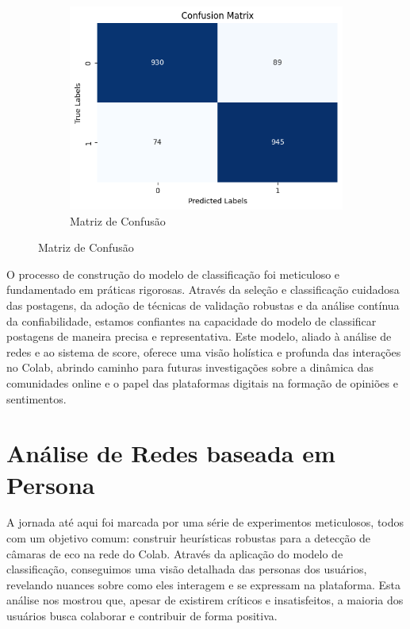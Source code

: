 \begin{figure}[htb]
\begin{subfigure}[b]{0.49\textwidth}
		\includegraphics[width=\textwidth]{images/persona_confusion_matrix.png}
		\caption{Matriz de Confusão}
		\label{fig:persona_confusion_matrix}
	\end{subfigure}
	\fautor
\end{figure}

O processo de construção do modelo de classificação foi meticuloso e fundamentado em práticas rigorosas. Através da seleção e classificação cuidadosa das postagens, da adoção de técnicas de validação robustas e da análise contínua da confiabilidade, estamos confiantes na capacidade do modelo de classificar postagens de maneira precisa e representativa. Este modelo, aliado à análise de redes e ao sistema de score, oferece uma visão holística e profunda das interações no Colab, abrindo caminho para futuras investigações sobre a dinâmica das comunidades online e o papel das plataformas digitais na formação de opiniões e sentimentos.

\section{Análise de Redes baseada em Persona}

A jornada até aqui foi marcada por uma série de experimentos meticulosos, todos com um objetivo comum: construir heurísticas robustas para a detecção de câmaras de eco na rede do Colab. Através da aplicação do modelo de classificação, conseguimos uma visão detalhada das personas dos usuários, revelando nuances sobre como eles interagem e se expressam na plataforma. Esta análise nos mostrou que, apesar de existirem críticos e insatisfeitos, a maioria dos usuários busca colaborar e contribuir de forma positiva.

